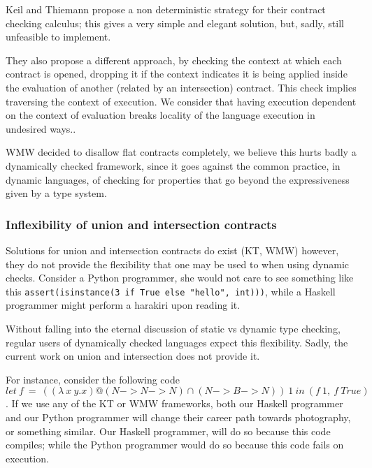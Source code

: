 Keil and Thiemann propose a non deterministic strategy for their contract checking
calculus; this gives a very simple and elegant solution, but, sadly, still
unfeasible to implement.

They also propose a different approach, by checking the context at which
each contract is opened, dropping
it if the context indicates it is being applied inside the evaluation of another
(related by an intersection) contract.
This check implies traversing the context of execution.
We consider that having execution dependent on the context
of evaluation breaks locality of
the language execution in undesired ways..

WMW decided to disallow flat contracts completely,
we believe this hurts badly a dynamically checked framework, since it goes against
the common practice, in dynamic languages, of checking for properties
that go beyond the expressiveness given by a type system.

\subsubsection*{Inflexibility of union and intersection contracts}

Solutions for union and intersection contracts do exist (KT, WMW) however,
they do not provide the flexibility that one may be used to when using dynamic checks.
Consider a Python programmer, she would not care to see something like this
\texttt{assert(isinstance(3 if True else "hello", int)))}, while a Haskell programmer
might perform a harakiri upon reading it.

Without falling into the eternal discussion of static vs dynamic type checking,
regular users of dynamically checked languages expect this flexibility.
Sadly, the current work on union and intersection does not provide it.

For instance, consider the following code
$let~f~=~((\lambda~x~y.x)@(N -> N -> N) \cap (N -> B -> N))~1~in~(f~1,~f~True)$.
If we use any of the KT or WMW frameworks, both our Haskell programmer and our
Python programmer will change their career path towards photography, or something
similar.
Our Haskell programmer, will do so because this code compiles;
while the Python programmer would do so because this code fails on execution.

